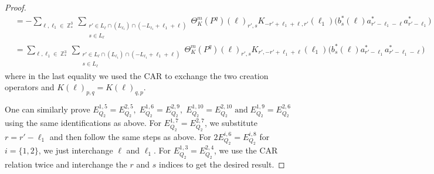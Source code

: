 \documentclass[sn-mathphys, Numbered ,a4paper]{sn-jnl}%
\DeclareMathOperator{\Z}{\mathbb{Z}}
\theoremstyle{plain}
\theoremstyle{definition}
\theoremstyle{remark}
\theoremstyle{plain}
\theoremstyle{definition}
\theoremstyle{remark}
\begin{document}
\begin{proof}
\begin{align}
		&=-\sum\limits_{\ell, \ell_1\in \Z^3_*}\sum\limits_{\substack{r' \in  L_{\ell} \cap (L_{\ell_1}) \cap (-L_{\ell_1}+\ell_1+\ell)\\ s \in L_{\ell}}} \Theta^m_K(P^q)(\ell)_{r',s} K_{-r'+\ell_1+\ell,r'}(\ell_1)\Big( b^*_{s}(\ell) a^*_{r'-\ell_1-\ell}a^*_{r'-\ell_1}\Big)\nonumber\\
		&=\sum\limits_{\ell, \ell_1\in \Z^3_*}\sum\limits_{\substack{r' \in  L_{\ell} \cap (L_{\ell_1}) \cap (-L_{\ell_1}+\ell_1+\ell)\\ s \in L_{\ell}}} \Theta^m_K(P^q)(\ell)_{r',s} K_{r',-r'+\ell_1+\ell}(\ell_1)\Big( b^*_{s}(\ell) a^*_{r'-\ell_1} a^*_{r'-\ell_1-\ell}\Big)\label{eq:EQ122} 
	\end{align}
	where in the last equality we used the CAR to exchange the two creation operators and $K(\ell)_{p,q}=K(\ell)_{q,p}$. 
	
	One can similarly prove $E_{Q_2}^{1,5}\!=\! E_{Q_2}^{2,5},\; E_{Q_2}^{1,6}\!=\! E_{Q_2}^{2,9},\; E_{Q_2}^{1,10}\!=\!E_{Q_2}^{2,10}\;\mathrm{and}\; E_{Q_2}^{1,9}\! =\! E_{Q_2}^{2,6}$ using the same identifications as above. 
	For $ E_{Q_2}^{1,7}\! =\! E_{Q_2}^{2,7}$, we substitute $r=r'-\ell_1$  and then follow the same steps as above.
	For $ 2E_{Q_2}^{i,6}\! =\! E_{Q_2}^{i,8}$ for $i=\{1,2\}$, we just interchange $\ell$ and $\ell_1$.   
	For $E_{Q_2}^{1,3}\! =\! E_{Q_2}^{2,4} $, we use the CAR relation twice and interchange the $r$ and $s$ indices to get the desired result.
\end{proof}
\end{document}
